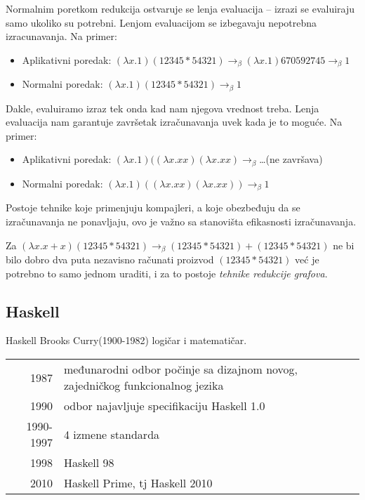 \documentclass[../main.tex]{subfiles}
\begin{document}
\begin{description}
Normalnim poretkom redukcija ostvaruje se lenja evaluacija -- izrazi se evaluiraju samo ukoliko su potrebni. Lenjom evaluacijom se izbegavaju nepotrebna izracunavanja. Na primer:
\begin{itemize}
\item[] Aplikativni poredak: $(\lambda x.1)(12345 * 54321) \rightarrow_\beta (\lambda x.1)670592745 \rightarrow_\beta 1$
\item[] Normalni poredak: $(\lambda x.1)(12345 * 54321) \rightarrow_\beta 1$
\end{itemize}
Dakle, evaluiramo izraz tek onda kad nam njegova vrednost treba. Lenja evaluacija nam garantuje završetak izračunavanja uvek kada je to moguće. Na primer:
\begin{itemize}
\item[] Aplikativni poredak: $(\lambda x.1)((\lambda x.x x)(\lambda x.x x) \rightarrow_\beta $\ldots (ne završava)
\item[] Normalni poredak: $(\lambda x.1)((\lambda x.x x)(\lambda x.x x)) \rightarrow_\beta 1$
\end{itemize}
Postoje tehnike koje primenjuju kompajleri, a koje obezbeđuju da se izračunavanja ne ponavljaju, ovo je važno sa stanovišta efikasnosti izračunavanja.
\begin{boxprimer}
Za $(\lambda x.x+x)(12345*54321) \rightarrow_\beta (12345*54321)+(12345*54321)$ ne bi bilo dobro dva puta nezavisno računati proizvod $(12345*54321)$ već je potrebno to samo jednom uraditi, i za to postoje {\it tehnike redukcije grafova}.
\end{boxprimer}

\end{description}

\begin{boxnaslovi}
\section{Haskell}								%
\end{boxnaslovi}
 \hfill %

Haskell Brooks Curry(1900-1982) logičar i matematičar. \\
\begin{tabular}{r|l}
1987 & međunarodni odbor počinje sa dizajnom novog, zajedničkog funkcionalnog jezika \\
1990 & odbor najavljuje specifikaciju Haskell 1.0\\
1990-1997& 4 izmene standarda\\
1998 & Haskell 98\\
2010 & Haskell Prime, tj Haskell 2010
\end{tabular}
\end{document}
